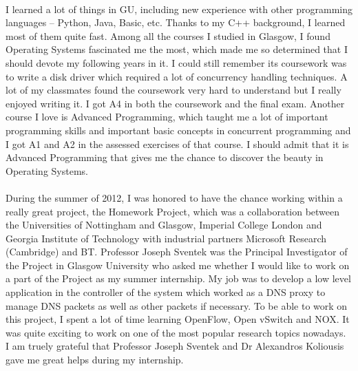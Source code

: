 \documentclass{article}
\begin{document}
\paragraph{} I learned a lot of things in GU, including new experience with other programming languages -- Python, Java, Basic, etc. Thanks to my C++ background, I learned most of them quite fast. Among all the courses I studied in Glasgow, I found Operating Systems fascinated me the most, which made me so determined that I should devote my following years in it. I could still remember its coursework was to write a disk driver which required a lot of concurrency handling techniques. A lot of my classmates found the coursework very hard to understand but I really enjoyed writing it. I got A4 in both the coursework and the final exam. Another course I love is Advanced Programming, which taught me a lot of important programming skills and important basic concepts in concurrent programming and I got A1 and A2 in the assessed exercises of that course. I should admit that it is Advanced Programming that gives me the chance to discover the beauty in Operating Systems.

\paragraph{} During the summer of 2012, I was honored to have the chance working within a really great project, the Homework Project, which was a collaboration between the Universities of Nottingham and Glasgow, Imperial College London and Georgia Institute of Technology with industrial partners Microsoft Research (Cambridge) and BT. Professor Joseph Sventek was the Principal Investigator of the Project in Glasgow University who asked me whether I would like to work on a part of the Project as my summer internship. My job was to develop a low level application in the controller of the system which worked as a DNS proxy to manage DNS packets as well as other packets if necessary. To be able to work on this project, I spent a lot of time learning OpenFlow, Open vSwitch and NOX. It was quite exciting to work on one of the most popular research topics nowadays. I am truely grateful that Professor Joseph Sventek and Dr Alexandros Koliousis gave me great helps during my internship.
\end{document}
